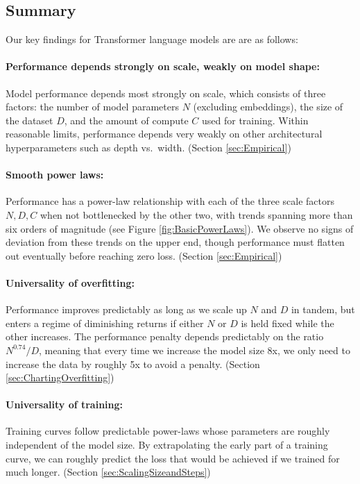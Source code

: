 \subsection{Summary}


Our key findings for Transformer language models are are as follows:

\paragraph{Performance depends strongly on scale, weakly on model shape:} Model performance depends most strongly on scale, which consists of three factors: the number of model parameters $N$ (excluding embeddings), the size of the dataset $D$, and the amount of compute $C$ used for training.  Within reasonable limits, performance depends very weakly on other architectural hyperparameters such as depth vs.~width. (Section \ref{sec:Empirical})

\paragraph{Smooth power laws:} Performance has a power-law relationship with each of the three scale factors $N, D, C$ when not bottlenecked by the other two, with trends spanning more than six orders of magnitude (see Figure \ref{fig:BasicPowerLaws}). We observe no signs of deviation from these trends on the upper end, though performance must flatten out eventually before reaching zero loss. (Section \ref{sec:Empirical})

\paragraph{Universality of overfitting:} Performance improves predictably as long as we scale up $N$ and $D$ in tandem, but enters a regime of diminishing returns if either $N$ or $D$ is held fixed while the other increases.  The performance penalty depends predictably on the ratio $N^{0.74}/D$, meaning that every time we increase the model size 8x, we only need to increase the data by roughly 5x to avoid a penalty. (Section \ref{sec:ChartingOverfitting})

\paragraph{Universality of training:} Training curves follow predictable power-laws whose parameters are roughly independent of the model size.  By extrapolating the early part of a training curve, we can roughly predict the loss that would be achieved if we trained for much longer. (Section \ref{sec:ScalingSizeandSteps})

